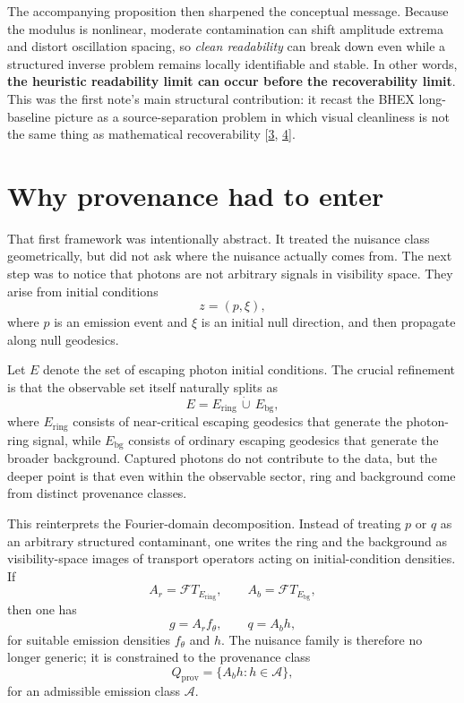\documentclass[10pt,letterpaper,twocolumn]{article}
\begin{document}
The accompanying proposition then sharpened the conceptual message. Because the modulus is nonlinear,
moderate contamination can shift amplitude extrema and distort oscillation spacing, so \emph{clean
readability} can break down even while a structured inverse problem remains locally identifiable and
stable. In other words, \textbf{the heuristic readability limit can occur before the recoverability
limit}. This was the first note's main structural contribution: it recast the BHEX long-baseline picture
as a source-separation problem in which visual cleanliness is not the same thing as mathematical
recoverability [\hyperlink{ref-3}{3}, \hyperlink{ref-4}{4}].

\section{Why provenance had to enter}

That first framework was intentionally abstract. It treated the nuisance class geometrically, but did not
ask where the nuisance actually comes from. The next step was to notice that photons are not arbitrary
signals in visibility space. They arise from initial conditions
\[
z=(p,\xi),
\]
where $p$ is an emission event and $\xi$ is an initial null direction, and then propagate along null
geodesics.

Let $E$ denote the set of escaping photon initial conditions. The crucial refinement is that the
observable set itself naturally splits as
\[
E = E_{\mathrm{ring}} \,\dot\cup\, E_{\mathrm{bg}},
\]
where $E_{\mathrm{ring}}$ consists of near-critical escaping geodesics that generate the photon-ring
signal, while $E_{\mathrm{bg}}$ consists of ordinary escaping geodesics that generate the broader
background. Captured photons do not contribute to the data, but the deeper point is that even within the
observable sector, ring and background come from distinct provenance classes.

This reinterprets the Fourier-domain decomposition. Instead of treating $p$ or $q$ as an arbitrary
structured contaminant, one writes the ring and the background as visibility-space images of transport
operators acting on initial-condition densities. If
\[
A_r=\mathcal F T_{E_{\mathrm{ring}}},
\qquad
A_b=\mathcal F T_{E_{\mathrm{bg}}},
\]
then one has
\[
g=A_r f_\theta,
\qquad
q=A_b h,
\]
for suitable emission densities $f_\theta$ and $h$. The nuisance family is therefore no longer generic;
it is constrained to the provenance class
\[
Q_{\mathrm{prov}}=\{A_b h:h\in\mathcal A\},
\]
for an admissible emission class $\mathcal A$.
\end{document}
